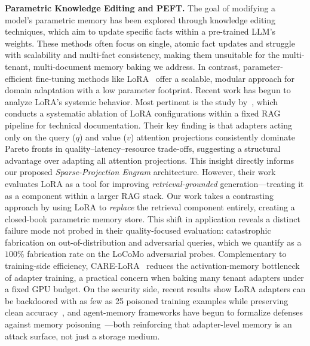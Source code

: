 \documentclass[conference]{IEEEtran}
\begin{document}
\textbf{Parametric Knowledge Editing and PEFT.} The goal of modifying a model's parametric memory has been explored through knowledge editing techniques, which aim to update specific facts within a pre-trained LLM's weights. These methods often focus on single, atomic fact updates and struggle with scalability and multi-fact consistency, making them unsuitable for the multi-tenant, multi-document memory baking we address. In contrast, parameter-efficient fine-tuning methods like LoRA~\cite{hu2022lora, lialin2023peft} offer a scalable, modular approach for domain adaptation with a low parameter footprint. Recent work has begun to analyze LoRA's systemic behavior. Most pertinent is the study by~\cite{qvpareto2026}, which conducts a systematic ablation of LoRA configurations within a fixed RAG pipeline for technical documentation. Their key finding is that adapters acting only on the query ($q$) and value ($v$) attention projections consistently dominate Pareto fronts in quality--latency--resource trade-offs, suggesting a structural advantage over adapting all attention projections. This insight directly informs our proposed \textit{Sparse-Projection Engram} architecture. However, their work evaluates LoRA as a tool for improving \textit{retrieval-grounded} generation---treating it as a component within a larger RAG stack. Our work takes a contrasting approach by using LoRA to \textit{replace} the retrieval component entirely, creating a closed-book parametric memory store. This shift in application reveals a distinct failure mode not probed in their quality-focused evaluation: catastrophic fabrication on out-of-distribution and adversarial queries, which we quantify as a $100\%$ fabrication rate on the LoCoMo adversarial probes. Complementary to training-side efficiency, CARE-LoRA~\cite{carelora2026} reduces the activation-memory bottleneck of adapter training, a practical concern when baking many tenant adapters under a fixed GPU budget. On the security side, recent results show LoRA adapters can be backdoored with as few as 25 poisoned training examples while preserving clean accuracy~\cite{lorabackdoor2026}, and agent-memory frameworks have begun to formalize defenses against memory poisoning~\cite{tmanm2026}---both reinforcing that adapter-level memory is an attack surface, not just a storage medium.
\end{document}
